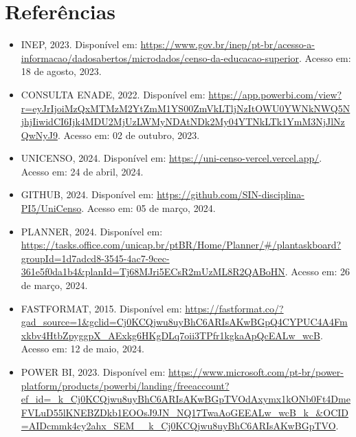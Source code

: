 \documentclass[a4paper,12pt]{article}
\begin{document}
\section{Referências}
\begin{itemize}
    \item INEP, 2023. Disponível em: \url{https://www.gov.br/inep/pt-br/acesso-a-informacao/dadosabertos/microdados/censo-da-educacao-superior}. Acesso em: 18 de agosto, 2023.
    \item CONSULTA ENADE, 2022. Disponível em: \url{https://app.powerbi.com/view?r=eyJrIjoiMzQxMTMzM2YtZmM1YS00ZmVkLTljNzItOWU0YWNkNWQ5NjhjIiwidCI6Ijk4MDU2MjUzLWMyNDAtNDk2My04YTNkLTk1YmM3NjJlNzQwNyJ9}. Acesso em: 02 de outubro, 2023.
    \item UNICENSO, 2024. Disponível em: \url{https://uni-censo-vercel.vercel.app/}. Acesso em: 24 de abril, 2024.
    \item GITHUB, 2024. Disponível em: \url{https://github.com/SIN-disciplina-PI5/UniCenso}. Acesso em: 05 de março, 2024.
    \item PLANNER, 2024. Disponível em: \url{https://tasks.office.com/unicap.br/ptBR/Home/Planner/#/plantaskboard?groupId=1d7adcd8-3545-4ac7-9cec-361e5f0da1b4&planId=Tj68MJri5ECsR2mUzML8R2QABoHN}. Acesso em: 26 de março, 2024.
    \item FASTFORMAT, 2015. Disponível em: \url{https://fastformat.co/?gad_source=1&gclid=Cj0KCQjwu8uyBhC6ARIsAKwBGpQ4CYPUC4A4Fmxkbv4HtbZpyggpX_AExkg6HKgDLq7oii3TPfr1kgkaApQcEALw_wcB}. Acesso em: 12 de maio, 2024.
    \item POWER BI, 2023. Disponível em: \url{https://www.microsoft.com/pt-br/power-platform/products/powerbi/landing/freeaccount?ef_id=_k_Cj0KCQjwu8uyBhC6ARIsAKwBGpTVOdAxymx1kONb0Ft4DmeFVLuD55lKNEBZDkb1EOOsJ9JN_NQ17TwaAoGEEALw_wcB_k_&OCID=AIDcmmk4cy2ahx_SEM__k_Cj0KCQjwu8uyBhC6ARIsAKwBGpTVO}.
\end{itemize}
\end{document}
